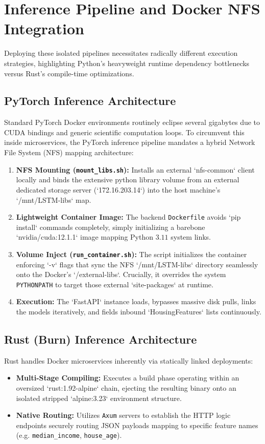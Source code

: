 \documentclass[12pt]{article}
\begin{document}
\section{Inference Pipeline and Docker NFS Integration}

Deploying these isolated pipelines necessitates radically different execution strategies, highlighting Python's heavyweight runtime dependency bottlenecks versus Rust's compile-time optimizations.

\subsection{PyTorch Inference Architecture}
Standard PyTorch Docker environments routinely eclipse several gigabytes due to CUDA bindings and generic scientific computation loops. To circumvent this inside microservices, the PyTorch inference pipeline mandates a hybrid Network File System (NFS) mapping architecture:
\begin{enumerate}
    \item \textbf{NFS Mounting (\texttt{mount\_libs.sh}):} Installs an external `nfs-common` client locally and binds the extensive python library volume from an external dedicated storage server (`172.16.203.14`) into the host machine's `/mnt/LSTM-libs` map.
    \item \textbf{Lightweight Container Image:} The backend \texttt{Dockerfile} avoids `pip install` commands completely, simply initializing a barebone `nvidia/cuda:12.1.1` image mapping Python $3.11$ system links. 
    \item \textbf{Volume Inject (\texttt{run\_container.sh}):} The script initializes the container enforcing `-v` flags that sync the NFS `/mnt/LSTM-libs` directory seamlessly onto the Docker's `/external-libs`. Crucially, it overrides the system \texttt{PYTHONPATH} to target those external `site-packages` at runtime.
    \item \textbf{Execution:} The `FastAPI` instance loads, bypasses massive disk pulls, links the models iteratively, and fields inbound `HousingFeatures` lists continuously.
\end{enumerate}

\subsection{Rust (Burn) Inference Architecture}
Rust handles Docker microservices inherently via statically linked deployments:
\begin{itemize}
    \item \textbf{Multi-Stage Compiling:} Executes a build phase operating within an oversized `rust:1.92-alpine` chain, ejecting the resulting binary onto an isolated stripped `alpine:3.23` environment structure.
    \item \textbf{Native Routing:} Utilizes \texttt{Axum} servers to establish the HTTP logic endpoints securely routing JSON payloads mapping to specific feature names (e.g. \texttt{median\_income}, \texttt{house\_age}).
\end{itemize}
\end{document}
